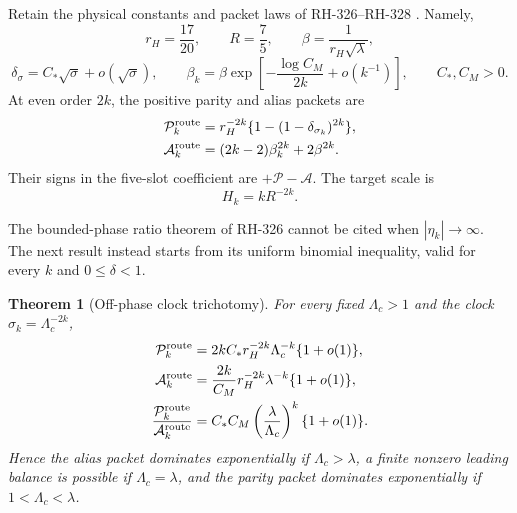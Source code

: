 \documentclass[11pt]{article}
\newtheorem{theorem}{Theorem}[section]
\theoremstyle{remark}
\newcommand{\cA}{\mathcal A}
\newcommand{\cP}{\mathcal P}
\newcommand{\Hk}{H_k}
\begin{document}
Retain the physical constants and packet laws of RH-326--RH-328
\citep{WangFirstAlias2026,WangMatching2026}.  Namely,
\begin{equation}\label{eq:constants}
 r_H=\frac{17}{20},\qquad R=\frac75,\qquad
 \beta=\frac1{r_H\sqrt\lambda},
\end{equation}
\begin{equation}\label{eq:physical-laws}
 \delta_\sigma=C_*\sqrt\sigma+o(\sqrt\sigma),
 \qquad
 \beta_k=\beta\exp\left[-\frac{\log C_M}{2k}+o(k^{-1})\right],
 \qquad C_*,C_M>0.
\end{equation}
At even order $2k$, the positive parity and alias packets are
\begin{align}
 \cP_k^{\rm route}
 &=r_H^{-2k}\{1-(1-\delta_{\sigma_k})^{2k}\},
 \label{eq:route-parity}\\
 \cA_k^{\rm route}
 &=(2k-2)\beta_k^{2k}+2\beta^{2k}.
 \label{eq:route-alias}
\end{align}
Their signs in the five-slot coefficient are $+\cP-\cA$.  The target scale
is
\begin{equation}\label{eq:target}
 \Hk=kR^{-2k}.
\end{equation}

The bounded-phase ratio theorem of RH-326 cannot be cited when
$|\eta_k|\to\infty$.  The next result instead starts from its uniform
binomial inequality, valid for every $k$ and $0\le\delta<1$.

\begin{theorem}[Off-phase clock trichotomy]\label{thm:trichotomy}
For every fixed $\Lambda_c>1$ and the clock
$\sigma_k=\Lambda_c^{-2k}$,
\begin{align}
 \cP_k^{\rm route}
 &=2kC_*r_H^{-2k}\Lambda_c^{-k}\{1+o(1)\},
 \label{eq:P-asymptotic}\\
 \cA_k^{\rm route}
 &=\frac{2k}{C_M}r_H^{-2k}\lambda^{-k}\{1+o(1)\},
 \label{eq:A-asymptotic}\\
 \frac{\cP_k^{\rm route}}{\cA_k^{\rm route}}
 &=C_*C_M\left(\frac{\lambda}{\Lambda_c}\right)^k
 \{1+o(1)\}.
 \label{eq:ratio-trichotomy}
\end{align}
Hence the alias packet dominates exponentially if $\Lambda_c>\lambda$,
a finite nonzero leading balance is possible if $\Lambda_c=\lambda$, and the
parity packet dominates exponentially if $1<\Lambda_c<\lambda$.
\end{theorem}
\end{document}
